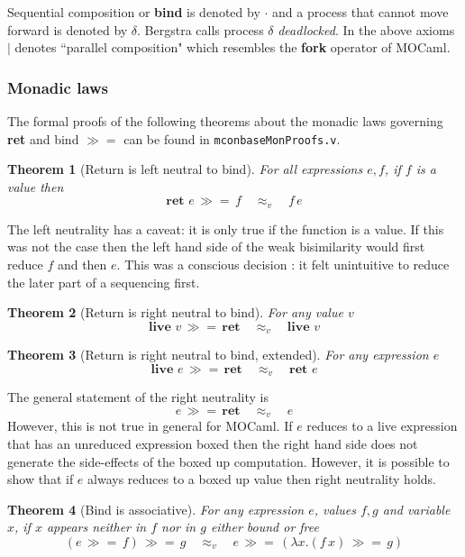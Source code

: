 \documentclass[12pt,twoside,notitlepage]{report}
\theoremstyle{plain}%
\newtheorem{thm}{Theorem}[section]
\theoremstyle{definition}
\theoremstyle{remark}
\begin{document}
Sequential composition or \textbf{bind} is denoted by $ \cdot $ and a process that cannot move forward is denoted by $ \delta $. Bergstra\cite{bergstra1984process} calls process $ \delta $ \textit{deadlocked}. In the above axioms $ \mid $ denotes ``parallel composition" which resembles the \textbf{fork} operator of MOCaml.

\subsubsection{Monadic laws}
\label{sec:equivs}
The formal proofs of the following theorems about the monadic laws governing \textbf{ret} and bind $ \gg= $ can be found in \verb|mconbaseMonProofs.v|.

\begin{thm}[Return is left neutral to bind]
For all expressions $ e, f $, if $ f $ is a value then
\[ \textbf{ret } e\,\gg=\, f\quad \approx_v \quad f\,e \]
\end{thm}

The left neutrality has a caveat: it is only true if the function is a value. If this was not the case then the left hand side of the weak bisimilarity would first reduce $ f $ and then $ e $. This was a conscious decision : it felt unintuitive to reduce the later part of a sequencing first. 

\begin{thm}[Return is right neutral to bind]
For any value $ v$
\[  \textbf{live }v\,\gg=\, \textbf{ret}\quad \approx_v \quad \textbf{live }v \]
\end{thm}

\begin{thm}[Return is right neutral to bind, extended]
For any expression $ e$
\[  \textbf{live }e\,\gg=\, \textbf{ret}\quad \approx_v \quad \textbf{ret } e \]
\end{thm}

The general statement of the right neutrality is 
\[  e\,\gg=\, \textbf{ret}\quad \approx_v \quad e \]
However, this is not true in general for MOCaml. If $ e $ reduces to a live expression that has an unreduced expression boxed then the right hand side does not generate the side-effects of the boxed up computation. However, it is possible to show that if $ e $ always reduces to a boxed up value then right neutrality holds.

\begin{thm}[Bind is associative]
For any expression $ e $, values $ f, g $ and variable $ x $, if $ x $ appears neither in $ f $ nor in $ g $ either bound or free
\[ (e\, \gg=\, f) \, \gg=\, g \quad \approx_v \quad e\, \gg=\, (\lambda x. (f\, x) \, \gg=\, g ) \]
\end{thm}
\end{document}
